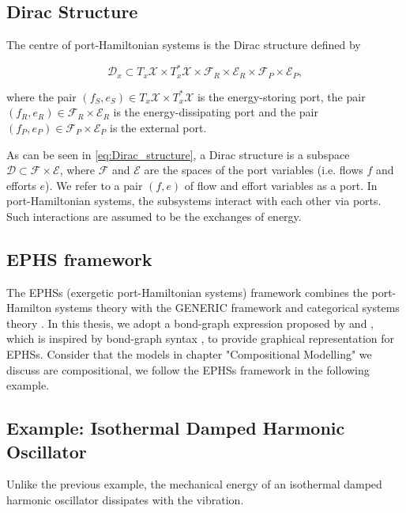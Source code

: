 \documentclass[
	parskip, 			   %
	twoside, 			   %
	DIV=14, 			   %
	BCOR=15.0mm, 		   %
	headsepline, 		   %
	open=right, 		   %
	captions=tableheading, %
	bibliography=totoc,    %
	numbers=noenddot       %
]{scrreprt}
\begin{document}
\subsection{Dirac Structure}
The centre of port-Hamiltonian systems is the Dirac structure defined by

\begin{equation}
    \label{eq:Dirac_structure}
    \mathcal{D}_x \subset T_{x}\mathcal{X} \times T_{x}^{*}\mathcal{X} \times \mathcal{F}_R \times \mathcal{E}_R \times \mathcal{F}_P \times \mathcal{E}_P,
\end{equation}

where the pair $(f_S, e_S) \in T_{x}\mathcal{X} \times T_{x}^{*}\mathcal{X}$ is the energy-storing port, the pair $(f_R, e_R) \in \mathcal{F}_R \times \mathcal{E}_R$ is the energy-dissipating port and the pair $(f_P, e_P) \in \mathcal{F}_P \times \mathcal{E}_P$ is the external port.

As can be seen in \ref{eq:Dirac_structure}, a Dirac structure is a subspace $\mathcal{D} \subset \mathcal{F} \times \mathcal{E}$, where $\mathcal{F}$ and $\mathcal{E}$ are the spaces of the port variables (i.e. flows $f$ and efforts $e$). We refer to a pair $(f,e)$ of flow and effort variables as a port. In port-Hamiltonian systems, the subsystems interact with each other via ports. Such interactions are assumed to be the exchanges of energy.

\subsection{EPHS framework}
The EPHSs (exergetic port-Hamiltonian systems) framework combines the port-Hamilton systems theory with the GENERIC framework and categorical systems theory \cite{lohmayer2021exergetic}. In this thesis, we adopt a bond-graph expression proposed by \cite{lohmayer2022ephs} and \cite{lohmayer2022exergetic}, which is inspired by bond-graph syntax \cite{paynter1961analysis}, to provide graphical representation for EPHSs. Consider that the models in chapter "Compositional Modelling" we discuss are compositional, we follow the EPHSs framework in the following example.

\subsection{Example: Isothermal Damped Harmonic Oscillator}
Unlike the previous example, the mechanical energy of an isothermal damped harmonic oscillator dissipates with the vibration.
\end{document}
